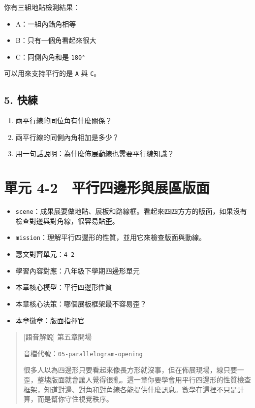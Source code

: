 \documentclass[
  chinese,
  12pt,
  a4paper,
  oneside]{article}
\providecommand{\tightlist}{%
  \setlength{\itemsep}{0pt}\setlength{\parskip}{0pt}}
\begin{document}
你有三組地貼檢測結果：

\begin{itemize}
\tightlist
\item
  A：一組內錯角相等
\item
  B：只有一個角看起來很大
\item
  C：同側內角和是 \texttt{180°}
\end{itemize}

可以用來支持平行的是 \texttt{A} 與 \texttt{C}。

\subsection{5. 快練}\label{ux5febux7df4-4}

\begin{enumerate}
\def\labelenumi{\arabic{enumi}.}
\tightlist
\item
  兩平行線的同位角有什麼關係？
\item
  兩平行線的同側內角相加是多少？
\item
  用一句話說明：為什麼佈展動線也需要平行線知識？
\end{enumerate}

\newpage

\section{單元
4-2　平行四邊形與展區版面}\label{ux55aeux5143-4-2-ux5e73ux884cux56dbux908aux5f62ux8207ux5c55ux5340ux7248ux9762}

\begin{itemize}
\tightlist
\item
  \texttt{scene}：成果展要做地貼、展板和路線框。看起來四四方方的版面，如果沒有檢查對邊與對角線，很容易貼歪。
\item
  \texttt{mission}：理解平行四邊形的性質，並用它來檢查版面與動線。
\item
  惠文對齊單元：\texttt{4-2}
\item
  學習內容對應：八年級下學期四邊形單元
\item
  本章核心模型：平行四邊形性質
\item
  本章核心決策：哪個展板框架最不容易歪？
\item
  本章徽章：版面指揮官
\end{itemize}

\begin{quote}
{[}語音解說{]} 第五章開場

音檔代號：\texttt{05-parallelogram-opening}

很多人以為四邊形只要看起來像長方形就沒事，但在佈展現場，線只要一歪，整塊版面就會讓人覺得很亂。這一章你要學會用平行四邊形的性質檢查框架，知道對邊、對角和對角線各能提供什麼訊息。數學在這裡不只是計算，而是幫你守住視覺秩序。
\end{quote}
\end{document}
